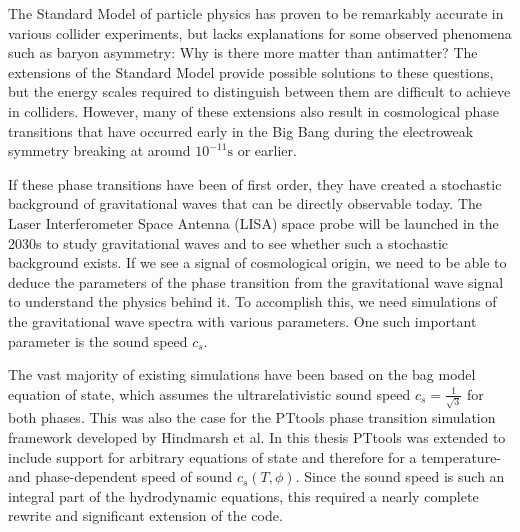 \iffalse
Motivation
\begin{itemize}
    \item Standard model: matches observations but lacks important explanations
    \item Baryon asymmetry
    \item GWs: a window to physics beyond the SM
    \item By phase transitions
    \item LISA project
\end{itemize}

The thesis
\begin{itemize}
    \item Highlights from the work, especially the title / thesis statement
    \item Findings
    \item Conclusion
\end{itemize}

This is among the last sections to be written.
\fi

The Standard Model of particle physics has proven to be remarkably accurate in various collider experiments,
but lacks explanations for some observed phenomena such as baryon asymmetry: Why is there more matter than antimatter?
The extensions of the Standard Model provide possible solutions to these questions,
but the energy scales required to distinguish between them are difficult to achieve in colliders.
However, many of these extensions also result in cosmological phase transitions that have occurred early in the Big Bang during the electroweak symmetry breaking at around $10^{-11} \text{s}$ or earlier.

If these phase transitions have been of first order,
they have created a stochastic background of gravitational waves that can be directly observable today.
The Laser Interferometer Space Antenna (LISA) space probe will be launched in the 2030s to study gravitational waves and
to see whether such a stochastic background exists.
If we see a signal of cosmological origin,
we need to be able to deduce the parameters of the phase transition from the gravitational wave signal to understand the physics behind it.
To accomplish this, we need simulations of the gravitational wave spectra with various parameters.
One such important parameter is the sound speed $c_s$.

The vast majority of existing simulations have been based on the bag model equation of state,
which assumes the ultrarelativistic sound speed $c_s =\frac{1}{\sqrt{3}}$ for both phases.
This was also the case for the PTtools phase transition simulation framework developed by Hindmarsh et al.
In this thesis PTtools was extended to include support for arbitrary equations of state and therefore for a temperature- and phase-dependent speed of sound $c_s(T,\phi)$.
Since the sound speed is such an integral part of the hydrodynamic equations,
this required a nearly complete rewrite and significant extension of the code.

